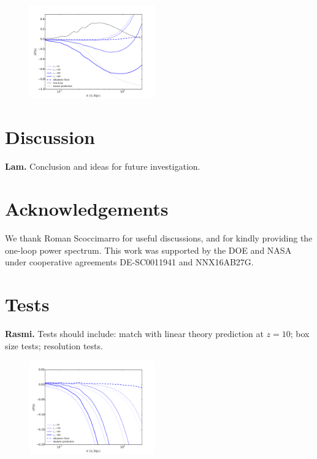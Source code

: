 \documentclass[aps,showpacs,twocolumn,floats,prd,superscriptaddress,nofootinbib]{revtex4}
\begin{document}
\begin{figure}[htb]
\begin{center}
\includegraphics[width=0.48\textwidth]{z0fig}
\end{center}
\caption
{
}
\label{z0fig}
\end{figure}

\section{Discussion}

{\bf Lam.} Conclusion and ideas for future investigation.

\vspace{0.1in}

\section*{Acknowledgements} 
We thank Roman Scoccimarro for useful discussions, and for kindly providing
the one-loop power spectrum.
This work was supported by the DOE and NASA under cooperative agreements
DE-SC0011941 and NNX16AB27G. 

\appendix

\section{Tests}

{\bf Rasmi.} Tests should include: match with linear theory prediction
at $z=10$; box size tests; resolution tests.

\begin{figure}[htb]
\begin{center}
\includegraphics[width=0.48\textwidth]{z10fig}
\end{center}
\caption
{
}
\label{z10fig}
\end{figure}




\end{document}
